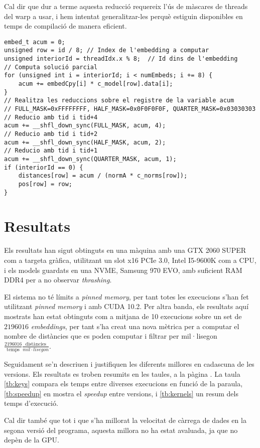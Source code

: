\documentclass[catalan,10pt,a4paper]{article}
\begin{document}
Cal dir que dur a terme aquesta reducció requereix l'ús de màscares de threads del warp a usar, i hem intentat generalitzar-les perquè estiguin disponibles en temps de compilació de manera eficient.
\newpage
\begin{verbatim}
embed_t acum = 0;
unsigned row = id / 8; // Index de l'embedding a computar
unsigned interiorId = threadIdx.x % 8;  // Id dins de l'embedding
// Computa solució parcial
for (unsigned int i = interiorId; i < numEmbeds; i += 8) {
	acum += embedCpy[i] * c_model[row].data[i]; 
}
// Realitza les reduccions sobre el registre de la variable acum
// FULL_MASK=0xFFFFFFFF, HALF_MASK=0x0F0F0F0F, QUARTER_MASK=0x03030303
// Reducio amb tid i tid+4
acum += __shfl_down_sync(FULL_MASK, acum, 4); 
// Reducio amb tid i tid+2
acum += __shfl_down_sync(HALF_MASK, acum, 2);
// Reducio amb tid i tid+1
acum += __shfl_down_sync(QUARTER_MASK, acum, 1);
if (interiorId == 0) {
	distances[row] = acum / (normA * c_norms[row]);
	pos[row] = row;
}
\end{verbatim}
\section*{Resultats}\label{sec:results}
Els resultats han sigut obtinguts en una màquina amb una GTX 2060 SUPER com a targeta gràfica, utilitzant un slot x16 PCIe 3.0, Intel I5-9600K com a CPU, i els models guardats en una NVME, Samsung 970 EVO, amb suficient RAM DDR4 per a no observar \textit{thrashing}. 

El sistema no té límits a \textit{pinned memory}, per tant totes les execucions s'han fet utilitzant \textit{pinned memory} i amb CUDA 10.2. Per altra banda, els resultats aquí mostrats han estat obtinguts com a mitjana de 10 execucions sobre un set de $2196016$ \textit{embeddings}, per tant s'ha creat una nova mètrica per a computar el nombre de distàncies que es poden computar i filtrar per mil·lisegon $\frac{2196016}{\text{temps}}\frac{\text{distàncies}}{mil·lisegon}$.

Seguidament se'n descriuen i justifiquen les diferents millores en cadascuna de les versions. Els resultats es troben resumits en les taules, a la pàgina \pageref{tb:keys}. La taula \ref{tb:keys} compara els temps entre diverses execucions en funció de la paraula, \ref{tb:speedup} en mostra el \textit{speedup} entre versions, i \ref{tb:kernels} un resum dels temps d'execució.

Cal dir també que tot i que s'ha millorat la velocitat de càrrega de dades en la segona versió del programa, aquesta millora no ha estat avaluada, ja que no depèn de la GPU.
\end{document}

